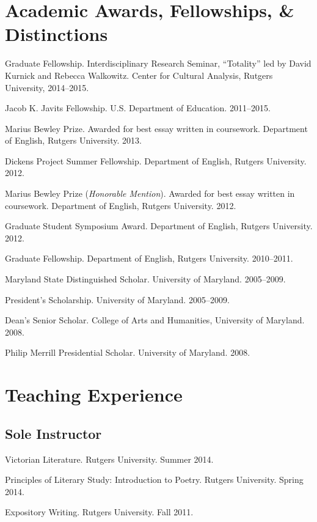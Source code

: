 \documentclass[10pt,letterpaper]{article}
\renewenvironment{itemize}{
  \begin{list}{}{
    \setlength{\leftmargin}{1.5em}
    \setlength{\itemsep}{0.25em}
    \setlength{\parskip}{0pt}
    \setlength{\parsep}{0.25em}
  }
}{
  \end{list}
}
\begin{document}
\section*{Academic Awards, Fellowships, \& Distinctions}

\begin{itemize}
\item Graduate Fellowship. Interdisciplinary Research Seminar, ``Totality'' led by David Kurnick and Rebecca Walkowitz. Center for Cultural Analysis, Rutgers University, 2014--2015.
\item Jacob K. Javits Fellowship. U.S. Department of Education. 2011--2015.
\item Marius Bewley Prize. Awarded for best essay written in coursework. Department of English, Rutgers University. 2013.
\item Dickens Project Summer Fellowship. Department of English, Rutgers University. 2012.
\item Marius Bewley Prize (\emph{Honorable Mention}). Awarded for best essay written in coursework. Department of English, Rutgers University. 2012.
\item Graduate Student Symposium Award. Department of English, Rutgers University. 2012.
\item Graduate Fellowship. Department of English, Rutgers University. 2010--2011.
\item Maryland State Distinguished Scholar. University of Maryland. 2005--2009.
\item President's Scholarship. University of Maryland. 2005--2009.
\item Dean's Senior Scholar. College of Arts and Humanities, University of Maryland. 2008.
\item Philip Merrill Presidential Scholar. University of Maryland. 2008.

\end{itemize}


\section*{Teaching Experience}

\subsection*{Sole Instructor}
\begin{itemize}
\item Victorian Literature. Rutgers University. Summer 2014.
\item Principles of Literary Study: Introduction to Poetry. Rutgers University. Spring 2014.
\item Expository Writing. Rutgers University. Fall 2011.
\end{itemize}
\end{document}
